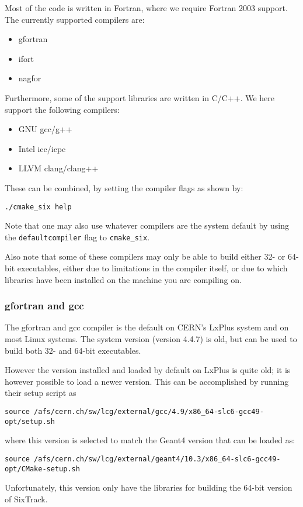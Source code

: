 \documentclass[english,BCOR=0mm,DIV=18]{scrartcl}
\begin{document}
Most of the code is written in Fortran, where we require Fortran 2003 support.
The currently supported compilers are:
\begin{itemize}
\item gfortran
\item ifort
\item nagfor
\end{itemize}
Furthermore, some of the support libraries are written in C/C++.
We here support the following compilers:
\begin{itemize}
\item GNU gcc/g++
\item Intel icc/icpc
\item LLVM clang/clang++
\end{itemize}
These can be combined, by setting the compiler flags as shown by:
\begin{lstlisting}
./cmake_six help
\end{lstlisting}
Note that one may also use whatever compilers are the system default by using the \texttt{defaultcompiler} flag to \texttt{cmake\_six}.

Also note that some of these compilers may only be able to build either 32- or 64-bit executables, either due to limitations in the compiler itself, or due to which libraries have been installed on the machine you are compiling on.

\subsubsection{gfortran and gcc}
\label{sec:building:compilers:gcc}
The gfortran and gcc compiler is the default on CERN's LxPlus system and on most Linux systems.
The system version (version 4.4.7) is old, but can be used to build both 32- and 64-bit executables.

However the version installed and loaded by default on LxPlus is quite old; it is however possible to load a newer version.
This can be accomplished by running their setup script as
\begin{lstlisting}
source /afs/cern.ch/sw/lcg/external/gcc/4.9/x86_64-slc6-gcc49-opt/setup.sh
\end{lstlisting}
where this version is selected to match the Geant4 version that can be loaded as:
\begin{lstlisting}
source /afs/cern.ch/sw/lcg/external/geant4/10.3/x86_64-slc6-gcc49-opt/CMake-setup.sh
\end{lstlisting}
Unfortunately, this version only have the libraries for building the 64-bit version of SixTrack.
\end{document}
